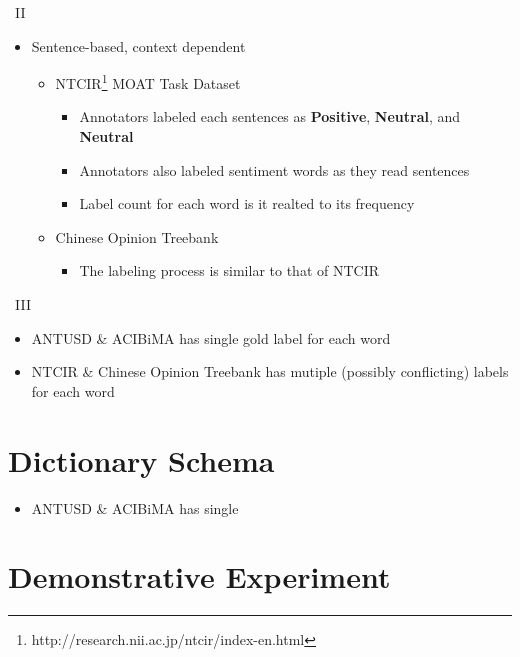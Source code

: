\documentclass[compress]{beamer}
\begin{document}
\begin{CJK*}{UTF8}{bsmi}
        \begin{frame}{\subsecname\ II}
            \begin{itemize}
                \item Sentence-based, context dependent
                    \begin{itemize}
                        \item NTCIR\footnote{http://research.nii.ac.jp/ntcir/index-en.html} MOAT Task Dataset 
                            \begin{itemize}
                                \item Annotators labeled each sentences as \textbf{Positive}, \textbf{Neutral}, and \textbf{Neutral}
                                \item Annotators also labeled sentiment words as they read sentences
                                \item Label count for each word is it realted to its frequency
                            \end{itemize}
                        \item Chinese Opinion Treebank
                            \begin{itemize}
                                \item The labeling process is similar to that of NTCIR
                            \end{itemize}
                    \end{itemize}
            \end{itemize}
        \end{frame}
        
        \begin{frame}{\subsecname\ III}
            \begin{itemize}
                \item ANTUSD \& ACIBiMA has single gold label for each word
                \item NTCIR \& Chinese Opinion Treebank has mutiple (possibly conflicting) labels for each word
            \end{itemize}
            
        \end{frame}

\section{Dictionary Schema}
    \begin{frame}{\secname}
        \begin{itemize}
            \item ANTUSD \& ACIBiMA has single 
        \end{itemize}
        
    \end{frame}
\end{CJK*}

\section{Demonstrative Experiment}
\end{document}
